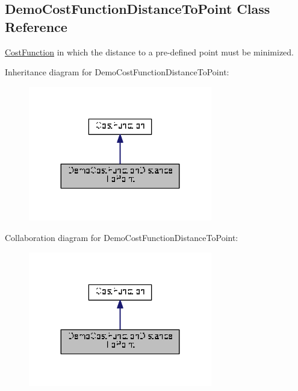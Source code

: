 \hypertarget{classDmpBbo_1_1DemoCostFunctionDistanceToPoint}{\subsection{Demo\+Cost\+Function\+Distance\+To\+Point Class Reference}
\label{classDmpBbo_1_1DemoCostFunctionDistanceToPoint}
}


\hyperlink{classDmpBbo_1_1CostFunction}{Cost\+Function} in which the distance to a pre-\/defined point must be minimized.  




Inheritance diagram for Demo\+Cost\+Function\+Distance\+To\+Point\+:
\nopagebreak
\begin{figure}[H]
\begin{center}
\leavevmode
\includegraphics[width=227pt]{classDmpBbo_1_1DemoCostFunctionDistanceToPoint__inherit__graph}
\end{center}
\end{figure}


Collaboration diagram for Demo\+Cost\+Function\+Distance\+To\+Point\+:
\nopagebreak
\begin{figure}[H]
\begin{center}
\leavevmode
\includegraphics[width=227pt]{classDmpBbo_1_1DemoCostFunctionDistanceToPoint__coll__graph}
\end{center}
\end{figure}
